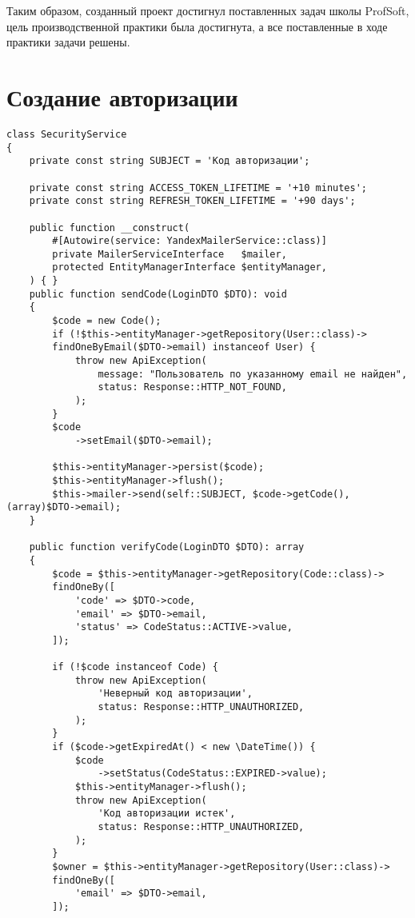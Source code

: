 \documentclass[pract]{SCWorks}
\begin{document}
Таким образом, созданный проект достигнул поставленных задач школы ProfSoft,
цель производственной практики была достигнута, а все поставленные в ходе
практики задачи решены.




\appendix

\section{Создание авторизации}
\label{appendA}

\begin{verbatim}
class SecurityService
{
    private const string SUBJECT = 'Код авторизации';

    private const string ACCESS_TOKEN_LIFETIME = '+10 minutes';
    private const string REFRESH_TOKEN_LIFETIME = '+90 days';

    public function __construct(
        #[Autowire(service: YandexMailerService::class)]
        private MailerServiceInterface   $mailer,
        protected EntityManagerInterface $entityManager,
    ) { }
    public function sendCode(LoginDTO $DTO): void
    {
        $code = new Code();
        if (!$this->entityManager->getRepository(User::class)->
        findOneByEmail($DTO->email) instanceof User) {
            throw new ApiException(
                message: "Пользователь по указанному email не найден",
                status: Response::HTTP_NOT_FOUND,
            );
        }
        $code
            ->setEmail($DTO->email);

        $this->entityManager->persist($code);
        $this->entityManager->flush();
        $this->mailer->send(self::SUBJECT, $code->getCode(), (array)$DTO->email);
    }

    public function verifyCode(LoginDTO $DTO): array
    {
        $code = $this->entityManager->getRepository(Code::class)->
        findOneBy([
            'code' => $DTO->code,
            'email' => $DTO->email,
            'status' => CodeStatus::ACTIVE->value,
        ]);

        if (!$code instanceof Code) {
            throw new ApiException(
                'Неверный код авторизации',
                status: Response::HTTP_UNAUTHORIZED,
            );
        }
        if ($code->getExpiredAt() < new \DateTime()) {
            $code
                ->setStatus(CodeStatus::EXPIRED->value);
            $this->entityManager->flush();
            throw new ApiException(
                'Код авторизации истек',
                status: Response::HTTP_UNAUTHORIZED,
            );
        }
        $owner = $this->entityManager->getRepository(User::class)->
        findOneBy([
            'email' => $DTO->email,
        ]);


\end{verbatim}
\end{document}
